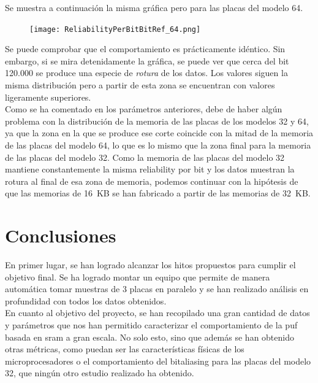 \documentclass[spanish]{template/minim}
\begin{document}
Se muestra a continuación la misma gráfica pero para las placas del modelo 64.\\

\begin{figure}[H]
    \centering
    \texttt{[image: ReliabilityPerBitBitRef\_64.png]}
\end{figure}

Se puede comprobar que el comportamiento es prácticamente idéntico. Sin embargo, si se mira detenidamente la gráfica, se puede ver que cerca del bit 120.000 se produce una especie de \textit{rotura} de los datos. Los valores siguen la misma distribución pero a partir de esta zona se encuentran con valores ligeramente superiores.\\

Como se ha comentado en los parámetros anteriores, debe de haber algún problema con la distribución de la memoria de las placas de los modelos 32 y 64, ya que la zona en la que se produce ese corte coincide con la mitad de la memoria de las placas del modelo 64, lo que es lo mismo que la zona final para la memoria de las placas del modelo 32. Como la memoria de las placas del modelo 32 mantiene constantemente la misma reliability por bit y los datos muestran la rotura al final de esa zona de memoria, podemos continuar con la hipótesis de que las memorias de 16~KB se han fabricado a partir de las memorias de 32~KB.\\

\section{Conclusiones}\label{sec:conclusions}

En primer lugar, se han logrado alcanzar los hitos propuestos para cumplir el objetivo final. Se ha logrado montar un equipo que permite de manera automática tomar muestras de 3 placas en paralelo y se han realizado análisis en profundidad con todos los datos obtenidos.\\

En cuanto al objetivo del proyecto, se han recopilado una gran cantidad de datos y parámetros que nos han permitido caracterizar el comportamiento de la \gls{puf} basada en \gls{sram} a gran escala. No solo esto, sino que además se han obtenido otras métricas, como puedan ser las características físicas de los microprocesadores o el comportamiento del bitaliasing para las placas del modelo 32, que ningún otro estudio realizado ha obtenido.\\
\end{document}
